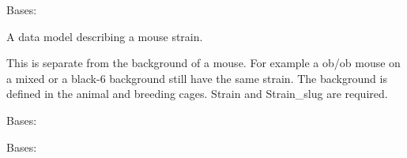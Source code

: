 \documentclass[letterpaper,10pt,english]{sphinxmanual}
\begin{document}

\begin{fulllineitems}
\label{api:mousedb.animal.models.Strain}
Bases: 

A data model describing a mouse strain.

This is separate from the background of a mouse.  For example a ob/ob mouse on a mixed or a black-6 background still have the same strain.  The background is defined in the animal and breeding cages.  Strain and Strain\_slug are required.


\begin{fulllineitems}
\label{api:mousedb.animal.models.Strain.DoesNotExist}
Bases: 

\end{fulllineitems}



\begin{fulllineitems}
\label{api:mousedb.animal.models.Strain.MultipleObjectsReturned}
Bases: 

\end{fulllineitems}



\begin{fulllineitems}
\label{api:mousedb.animal.models.Strain.animal_set}
\end{fulllineitems}



\begin{fulllineitems}
\label{api:mousedb.animal.models.Strain.breeding_set}
\end{fulllineitems}




\end{fulllineitems}
\end{document}

